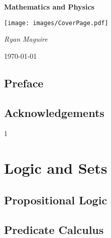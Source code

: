 \documentclass{book}                                                           %
\newcommand*{\TOPPATH}{books}
\newcommand*{\PARPATH}{\TOPPATH/}
\newcommand*{\PATH}{\TOPPATH/}
\def\compilefoundations{1}
\begin{document}
    \pagecolor{CoverPage}
    \begin{titlepage}
        \centering
        {\LARGE\bfseries{Mathematics and Physics}\par}
        \vspace{3.5cm}
        \texttt{[image: images/CoverPage.pdf]}
        \par\vspace{3cm}
        {\Large\itshape{Ryan Maguire}\par}
        \vfill
        {\large\today\par}
    \end{titlepage}
    \nopagecolor
    \tableofcontents
    \listoffigures
    \listoftables
    \clearpage
    \chapter*{Preface}
        
    \clearpage
    \chapter*{Acknowledgements}
        
    \clearpage

    \label{book:Foundations}%

    \if\compilefoundations1
        \renewcommand{\PARPATH}{\TOPPATH/Foundations/Logic_and_Sets}
        \part{Logic and Sets}
            \chapter{Propositional Logic}
                \renewcommand{\PATH}{\PARPATH/Propositional_Logic}
                \label{chapt:Propositional_Logic}%
                
                
            \chapter{Predicate Calculus}
                \renewcommand{\PATH}{\PARPATH/Predicate_Calculus}
                \label{chapt:Predicate_Calculus}%
                
\end{document}
